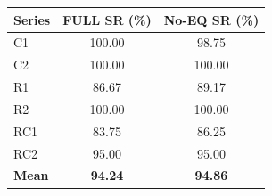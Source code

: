 \begin{tabular}{lcc}
\toprule
\textbf{Series} & \textbf{FULL SR (\%)} & \textbf{No-EQ SR (\%)} \\
\midrule
C1 & 100.00 & 98.75 \\
C2 & 100.00 & 100.00 \\
R1 & 86.67 & 89.17 \\
R2 & 100.00 & 100.00 \\
RC1 & 83.75 & 86.25 \\
RC2 & 95.00 & 95.00 \\
\midrule
\textbf{Mean} & \textbf{94.24} & \textbf{94.86} \\
\bottomrule
\end{tabular}
